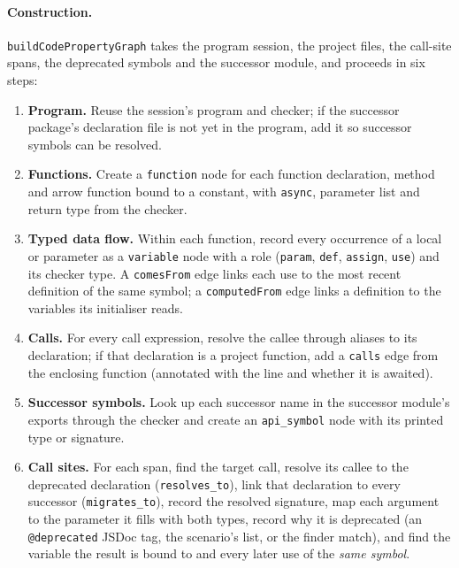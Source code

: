 \documentclass[11pt,a4paper]{article}
\newcommand{\code}[1]{\texttt{#1}}
\begin{document}
\paragraph{Construction.}
\code{buildCodePropertyGraph} takes the program session, the project files, the call-site
spans, the deprecated symbols and the successor module, and proceeds in six steps:
\begin{enumerate}
  \item \textbf{Program.} Reuse the session's program and checker; if the successor
        package's declaration file is not yet in the program, add it so successor symbols
        can be resolved.
  \item \textbf{Functions.} Create a \code{function} node for each function declaration,
        method and arrow function bound to a constant, with \code{async}, parameter list and
        return type from the checker.
  \item \textbf{Typed data flow.} Within each function, record every occurrence of a local
        or parameter as a \code{variable} node with a role (\code{param}, \code{def},
        \code{assign}, \code{use}) and its checker type. A \code{comesFrom} edge links each
        use to the most recent definition of the same symbol; a \code{computedFrom} edge
        links a definition to the variables its initialiser reads.
  \item \textbf{Calls.} For every call expression, resolve the callee through aliases to its
        declaration; if that declaration is a project function, add a \code{calls} edge
        from the enclosing function (annotated with the line and whether it is awaited).
  \item \textbf{Successor symbols.} Look up each successor name in the successor module's
        exports through the checker and create an \code{api\_symbol} node with its printed
        type or signature.
  \item \textbf{Call sites.} For each span, find the target call, resolve its callee to the
        deprecated declaration (\code{resolves\_to}), link that declaration to every successor
        (\code{migrates\_to}), record the resolved signature, map each argument to the
        parameter it fills with both types, record why it is deprecated (an
        \code{@deprecated} JSDoc tag, the scenario's list, or the finder match), and find the
        variable the result is bound to and every later use of the \emph{same symbol}.
\end{enumerate}
\end{document}
